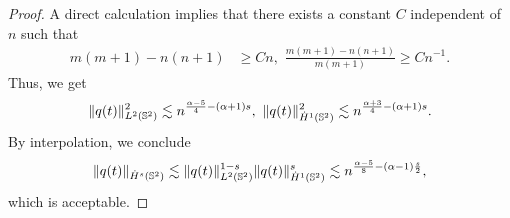 \documentclass[11pt, reqno]{amsart}
\numberwithin{equation}{section}
\theoremstyle{definition}
\theoremstyle{remark}
\begin{document}
{\begin{proof}
A direct calculation implies that there exists a constant  $C$ independent of $n$ such that
\begin{equation*}
\begin{aligned}
m(m+1)-n(n+1) &\ge C n,\,\,\frac{m(m+1)-n(n+1)}{m(m+1)} \ge C n^{-1}.
\end{aligned}
\end{equation*}
Thus, we get
\begin{equation}\label{fml-qt-bound}
\|q(t)\|^2_{L^2(\Bbb S^2)} \lesssim n^{\frac{\alpha-5}{4}-(\alpha+1)s},\,\, \|q(t)\|^2_{\dot{H}^1(\Bbb S^2)} \lesssim n^{\frac{\alpha+3}{4}-(\alpha+1)s}.
\end{equation}
By interpolation, we conclude
\begin{equation*}
\|q(t)\|_{\dot{H}^s(\Bbb S^2)} \lesssim \|q(t)\|^{1-s}_{L^2(\Bbb S^2)} \|q(t)\|^{s}_{\dot{H}^1(\Bbb S^2)} \lesssim n^{\frac{\alpha-5}{8}-(\alpha-1)\frac{s}{2}},
\end{equation*}
which is acceptable.
		

\end{proof}}
\end{document}
